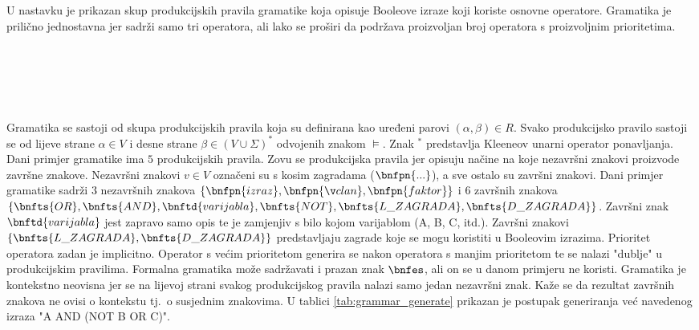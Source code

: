\documentclass[times, utf8, diplomski]{fer}
\begin{document}
\noindent
U nastavku je prikazan skup produkcijskih pravila gramatike koja opisuje Booleove izraze koji koriste osnovne operatore. Gramatika je prilično jednostavna jer sadrži samo tri operatora, ali lako se proširi da podržava proizvoljan broj operatora s proizvoljnim prioritetima.
%
\begin{bnf}
	 \\
	 \\
	 \\
	 \\
\end{bnf}

Gramatika se sastoji od skupa produkcijskih pravila koja su definirana kao uređeni parovi $(\alpha, \beta) \in R$. Svako produkcijsko pravilo sastoji se od lijeve strane $\alpha \in V$ i desne strane $\beta \in (V \cup \Sigma)^{*}$ odvojenih znakom $\models$. Znak $^{*}$ predstavlja Kleeneov unarni operator ponavljanja. Dani primjer gramatike ima $5$ produkcijskih pravila. Zovu se produkcijska pravila jer opisuju načine na koje nezavršni znakovi proizvode završne znakove. Nezavršni znakovi $v \in V$ označeni su s kosim zagradama ($\bnfpn{...}$), a sve ostalo su završni znakovi. Dani primjer gramatike sadrži $3$ nezavršnih znakova $\{ \bnfpn{izraz}, \bnfpn{član}, \bnfpn{faktor} \}$ i $6$ završnih znakova $\{ \bnfts{OR}, \bnfts{AND}, \bnftd{varijabla}, \bnfts{NOT}, \bnfts{L\_ZAGRADA}, \bnfts{D\_ZAGRADA} \}$. Završni znak $\bnftd{varijabla}$ jest zapravo samo opis te je zamjenjiv s bilo kojom varijablom (A, B, C, itd.). Završni znakovi $\{\bnfts{L\_ZAGRADA}, \bnfts{D\_ZAGRADA}\}$ predstavljaju zagrade koje se mogu koristiti u Booleovim izrazima. Prioritet operatora zadan je implicitno. Operator s većim prioritetom generira se nakon operatora s manjim prioritetom te se nalazi "dublje" u produkcijskim pravilima. Formalna gramatika može sadržavati i prazan znak $\bnfes$, ali on se u danom primjeru ne koristi. Gramatika je kontekstno neovisna jer se na lijevoj strani svakog produkcijskog pravila nalazi samo jedan nezavršni znak. Kaže se da rezultat završnih znakova ne ovisi o kontekstu tj.~o susjednim znakovima. U tablici \ref{tab:grammar_generate} prikazan je postupak generiranja već navedenog izraza "A AND (NOT B OR C)".
\end{document}
